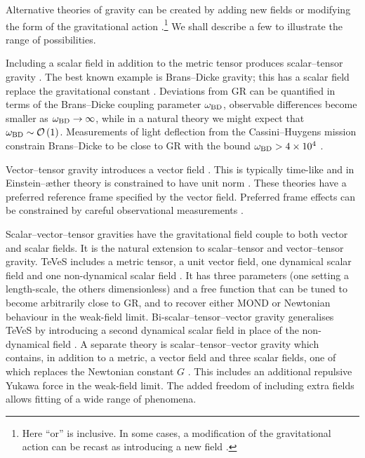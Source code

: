 Alternative theories of gravity can be created by adding new fields or modifying the form of the gravitational action \citep{Gair2012a}.\footnote{Here ``or'' is inclusive. In some cases, a modification of the gravitational action can be recast as introducing a new field \citep[e.g.,][]{Wands1994,Jacobson2010}.} We shall describe a few to illustrate the range of possibilities.

Including a scalar field in addition to the metric tensor produces scalar--tensor gravity \citep{Wagoner1970,Nordtvedt1970Jr,Fujii2003}. The best known example is Brans--Dicke gravity; this has a scalar field replace the gravitational constant \citep{Brans1961,Dicke1962}. Deviations from GR can be quantified in terms of the Brans--Dicke coupling parameter $\omega_\mathrm{BD}$, observable differences become smaller as $\omega_\mathrm{BD} \rightarrow \infty$, while in a natural theory we might expect that $\omega_\mathrm{BD} \sim \mathcal{O}\left({1}\right)$. Measurements of light deflection from the Cassini--Huygens mission \citep{Bertotti2003} constrain Brans--Dicke to be close to GR with the bound $\omega_\mathrm{BD} > 4 \times 10^4$ \citep{Will2006}.

Vector--tensor gravity introduces a vector field \citep{Will1972Jr,Nordtvedt1972Jr}. This is typically time-like and in Einstein--\ae{}ther theory is constrained to have unit norm \citep{Jacobson2001,Jacobson2008}. These theories have a preferred reference frame specified by the vector field. Preferred frame effects can be constrained by careful observational measurements \citep[chapter 8]{Will1993}.


Scalar--vector--tensor gravities have the gravitational field couple to both vector and scalar fields. It is the natural extension to scalar--tensor and vector--tensor gravity. TeVeS includes a metric tensor, a unit vector field, one dynamical scalar field and one non-dynamical scalar field \citep{Bekenstein2004,Skordis2009}. It has three parameters (one setting a length-scale, the others dimensionless) and a free function that can be tuned to become arbitrarily close to GR, and to recover either MOND or Newtonian behaviour in the weak-field limit. Bi-scalar--tensor--vector gravity generalises TeVeS by introducing a second dynamical scalar field in place of the non-dynamical field \citep{Sanders2005}. A separate theory is scalar--tensor--vector gravity which contains, in addition to a metric, a vector field and three scalar fields, one of which replaces the Newtonian constant $G$ \citep{Moffat2006}. This includes an additional repulsive Yukawa force in the weak-field limit. The added freedom of including extra fields allows fitting of a wide range of phenomena.

